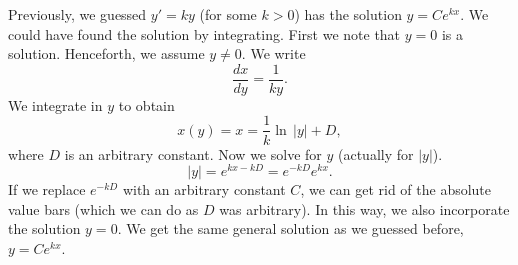 \begin{example}
Previously, we guessed $y' = ky$ (for some $k > 0$) has the solution
$y=Ce^{kx}$.  We could have found the solution by integrating.
First we note that $y=0$ is a solution.
Henceforth, we assume $y\not= 0$.  We write
\begin{equation*}
\frac{dx}{dy} = \frac{1}{ky} .
\end{equation*}
We integrate in $y$ to obtain
\begin{equation*}
x(y) = x = \frac{1}{k} \ln \, \lvert y \rvert + D,
\end{equation*}
where $D$ is an arbitrary constant.
Now we solve for $y$ (actually for $\lvert y \rvert$).
\begin{equation*}
\lvert y \rvert =
e^{kx-kD} = 
e^{-kD} e^{k x} .
\end{equation*}
If we replace $e^{-kD}$ with an arbitrary constant $C$, we can
get rid of the absolute value bars (which we can do as $D$ was arbitrary).  In
this way, we
also incorporate the solution $y=0$.  We get the same general solution as
we guessed before, $y = Ce^{kx}$.
\end{example}

